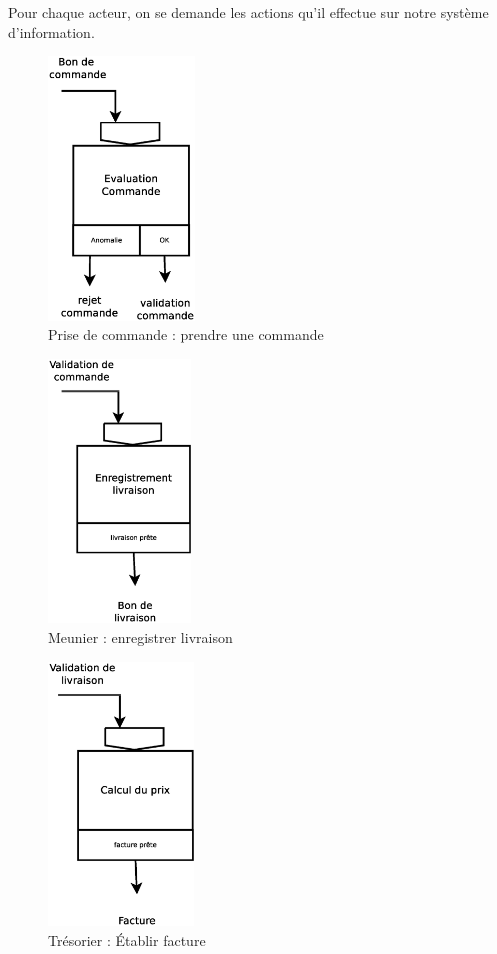 Pour chaque acteur, on se demande les actions qu'il effectue sur notre système d'information.

\begin{figure}[!htb]
    \begin{center}
    \includegraphics[height=7cm]{images/cc1_mct1.eps}
    \caption{\label{cc1_mct1} Prise de commande  : prendre une commande}
    \end{center}
\end{figure}

\begin{figure}[!htb]
    \begin{center}
    \includegraphics[height=7cm]{images/cc1_mct2.eps}
    \caption{\label{cc1_mct2} Meunier : enregistrer livraison}
    \end{center}
\end{figure}

\begin{figure}[!htb]
    \begin{center}
    \includegraphics[height=7cm]{images/cc1_mct3.eps}
    \caption{\label{cc1_mct3} Trésorier : Établir facture}
    \end{center}
\end{figure}

